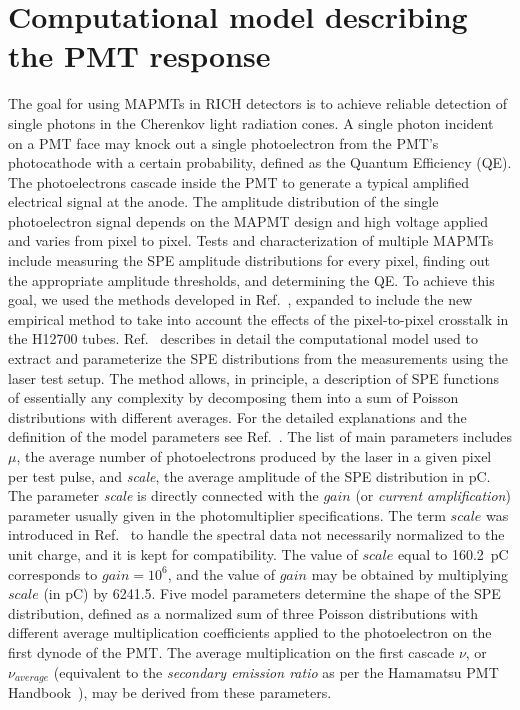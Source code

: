\section{Computational model describing the PMT response}

The goal for using MAPMTs in RICH detectors is to achieve reliable detection of single photons in the Cherenkov light radiation cones. A single photon incident on a PMT face may knock out a single photoelectron from the PMT's photocathode with a certain probability, defined as the Quantum Efficiency (QE). The photoelectrons cascade inside the PMT to generate a typical amplified electrical signal at the anode. The amplitude distribution of the single photoelectron signal depends on the MAPMT design and high voltage applied and varies from pixel to pixel. Tests and characterization of multiple MAPMTs include measuring the SPE amplitude distributions for every pixel, finding out the appropriate amplitude thresholds, and determining the QE. To achieve this goal, we used the methods developed in Ref.~\cite{DEGTIARENKO20171}, expanded to include the new empirical method to take into account the effects of the pixel-to-pixel crosstalk in the H12700 tubes. Ref.~\cite{DEGTIARENKO20171} describes in detail the computational model used to extract and parameterize the SPE distributions from the measurements using the laser test setup. The method allows, in principle, a description of SPE functions of essentially any complexity by decomposing them into a sum of Poisson distributions with different averages. For the detailed explanations and the definition of the model parameters see Ref.~\cite{DEGTIARENKO20171}. The list of main parameters includes $\mu$, the average number of photoelectrons produced by the laser in a given pixel per test pulse, and {\it{scale}}, the average amplitude of the SPE distribution in pC. 
The parameter {\it{scale}} is directly connected with the $gain$ (or {\it{current amplification}}) parameter usually given in the photomultiplier specifications. The term $scale$ was introduced in Ref.~\cite{DEGTIARENKO20171} to handle the spectral data not necessarily normalized to the unit charge, and it is kept for compatibility. The value of $scale$ equal to 160.2~pC corresponds to $gain=10^6$, and the value of $gain$ may be obtained by multiplying $scale$ (in pC) by 6241.5.
Five model parameters determine the shape of the SPE distribution, defined as a normalized sum of three Poisson distributions with different average multiplication coefficients  applied to the photoelectron on the first dynode of the PMT. The average multiplication on the first cascade ${\nu}$, or ${\nu_{average}}$ (equivalent to the {\it secondary emission ratio} as per the Hamamatsu PMT Handbook~\cite{Hamamatsu4thedition}), may be derived from these parameters. 
